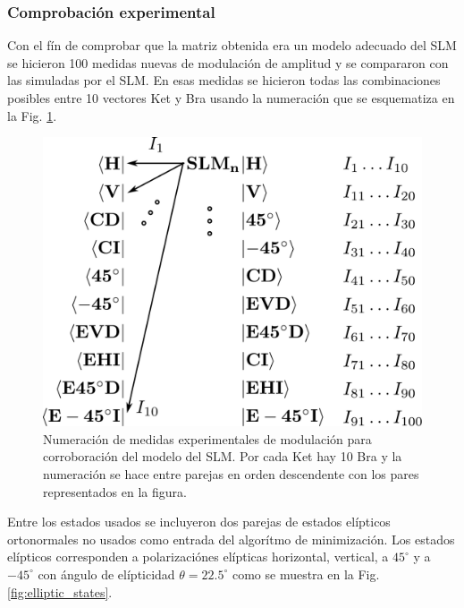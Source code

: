 \subsubsection{Comprobación experimental}
\label{sec:exp_validation}
Con el fín de comprobar que la matriz obtenida era un modelo adecuado
del SLM se hicieron 100 medidas nuevas de modulación de amplitud y se
compararon con las simuladas por el SLM. En esas medidas se hicieron
todas las combinaciones posibles entre 10 vectores Ket y Bra usando la
numeración que se esquematiza en la Fig. \ref{fig:braket_100_notation}.
\begin{figure}[h!]
\centering
\includegraphics[scale=.4]{brakets.pdf}
\caption[Numeración de medidas experimentales de modulación para
corroboración del modelo de SLM]{Numeración de medidas experimentales de modulación para
corroboración del modelo del SLM. Por cada Ket hay 10 Bra y la
numeración se hace entre parejas en orden descendente con los pares
representados en la figura. }
\label{fig:braket_100_notation}
\end{figure}
Entre los estados usados se incluyeron dos parejas de estados
elípticos ortonormales no usados
como entrada del algorítmo de minimización. Los estados elípticos
corresponden a polarizaciónes elípticas horizontal, vertical, a
$45^{\circ}$ y a $-45^{\circ}$ con ángulo de elípticidad $\theta
=22.5^{\circ}$ como se muestra en la Fig. \ref{fig:elliptic_states}.

